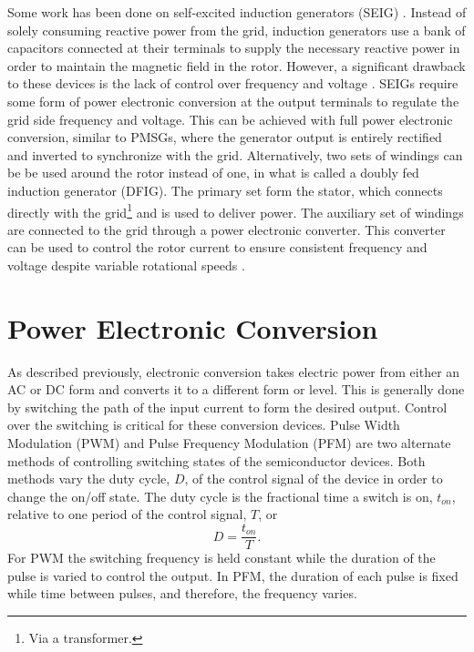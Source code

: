 Some work has been done on self-excited induction generators (SEIG) \cite{Ouazenne1983, Ammasaigounden1986}. Instead of solely consuming reactive power from the grid, induction generators use a bank of capacitors connected at their terminals to supply the necessary reactive power in order to maintain the magnetic field in the rotor. However, a significant drawback to these devices is the lack of control over frequency and voltage \cite{Bansal2005}. SEIGs require some form of power electronic conversion at the output terminals to regulate the grid side frequency and voltage. This can be achieved with full power electronic conversion, similar to PMSGs, where the generator output is entirely rectified and inverted to synchronize with the grid. Alternatively, two sets of windings can be be used around the rotor instead of one, in what is called a doubly fed induction generator (DFIG). The primary set form the stator, which connects directly with the grid\footnote{Via a transformer.} and is used to deliver power. The auxiliary set of windings are connected to the grid through a power electronic converter. This converter can be used to control the rotor current to ensure consistent frequency and voltage despite variable rotational speeds \cite{Muller2002, Bogalecka2002}.

\section{Power Electronic Conversion}
As described previously, electronic conversion takes electric power from either an AC or DC form and converts it to a different form or level. This is generally done by switching the path of the input current to form the desired output. Control over the switching is critical for these conversion devices. Pulse Width Modulation (PWM) and Pulse Frequency Modulation (PFM) are two alternate methods of controlling switching states of the semiconductor devices. Both methods vary the duty cycle, $D$, of the control signal of the device in order to change the on/off state. The duty cycle is the fractional time a switch is on, $t_{on}$, relative to one period of the control signal, $T$, or 
\begin{equation}
D = \frac{t_{on}}{T}. 
\end{equation}
For PWM the switching frequency is held constant while the duration of the pulse is varied to control the output. In PFM, the duration of each pulse is fixed while time between pulses, and therefore, the frequency varies.


